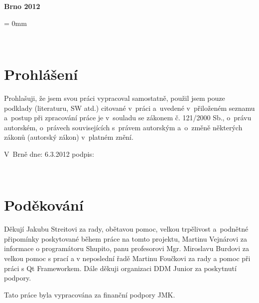 \documentclass[12pt, a4paper, oneside]{article}
\newcommand{\D}{\medskip \noindent} %
\newcommand{\B}{\textbf} %
\begin{document}
\vspace{20mm}

\begin{center}
\B{Brno 2012}

\end{center}
\normalsize
\newpage  %
\voffset = 0mm %

~ %

\vspace{10mm}

\section*{Prohlášení}

Prohlašuji, že jsem svou práci vypracoval samostatně, použil jsem pouze 
podklady (literaturu, SW atd.) citované v~práci a~uvedené v~přiloženém seznamu 
a~postup při zpracování práce je v~souladu se zákonem č. 121/2000 Sb., o~právu 
autorském, o~právech souvisejících s~právem autorským a~o~změně některých 
zákonů (autorský zákon) v~platném znění. 
 
\vspace{20mm} 
 
\noindent V~Brně  dne: 6.3.2012 \hspace{50mm}                 podpis:   
 

\newpage   %

~ %

\vspace{120mm}

\section*{Poděkování}
Děkují Jakubu Streitovi za rady, obětavou pomoc, velkou trpělivost a~podnětné připomínky poskytované během práce na tomto projektu, Martinu Vejnárovi za informace o programátoru Shupito, panu profesorovi Mgr. Miroslavu Burdovi za velkou pomoc s prací a v neposlední řadě Martinu Foučkovi za rady a pomoc při práci s Qt Frameworkem. Dále děkuji organizaci DDM Junior za poskytnutí podpory.

\D Tato práce byla vypracována za finanční podpory JMK.
 

\newpage   %
~ %
\vspace{10mm}
\end{document}
